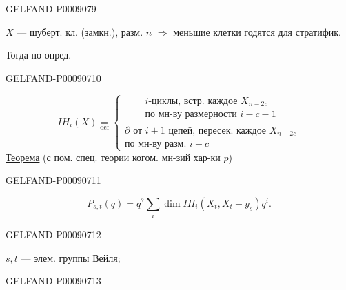 \begin{GelfandAdjacentEvidence}{GELFAND-P000907}{9}


\(X\) --- шуберт. кл. (замкн.), разм. \(n\) \(\Rightarrow\) меньшие клетки годятся для стратифик.

Тогда по опред.

\end{GelfandAdjacentEvidence}
\begin{GelfandAdjacentEvidence}{GELFAND-P000907}{10}


\begin{equation*}
IH_i(X)\underset{\mathrm{def}}{=}
\left\{\frac{\begin{gathered}
i\text{-циклы, встр. каждое }X_{n-2c}\\
\text{по мн-ву размерности }i-c-1
\end{gathered}}{\begin{gathered}
\partial\text{ от \(i+1\) цепей, пересек. каждое }X_{n-2c}\\
\text{по мн-ву разм. }i-c
\end{gathered}}\right.
\tag{4}
\end{equation*}
\uline{Теорема} (с пом. спец. теории когом. мн-зий хар-ки \(p\))
\end{GelfandAdjacentEvidence}
\begin{GelfandAdjacentEvidence}{GELFAND-P000907}{11}


\begin{equation*}
P_{s,t}(q)=q^{?}\sum_i\dim IH_i(X_t,X_t-y_s)q^i.
\tag{5}
\end{equation*}
\end{GelfandAdjacentEvidence}
\begin{GelfandAdjacentEvidence}{GELFAND-P000907}{12}


$s,t$ --- элем. группы Вейля;
\end{GelfandAdjacentEvidence}
\begin{GelfandAdjacentEvidence}{GELFAND-P000907}{13}


\end{GelfandAdjacentEvidence}



